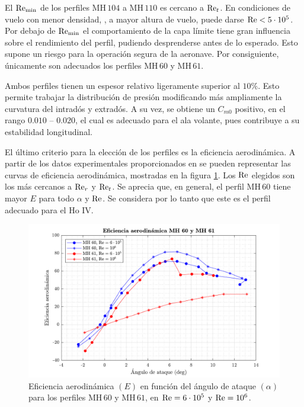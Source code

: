 \noindent
El $\mathrm{Re}_\text{min}$ de los perfiles $\mathrm{MH}\,104$ a $\mathrm{MH}\,110$ es cercano a $\mathrm{Re}_t$. En condiciones de vuelo con menor densidad, \eg, a mayor altura de vuelo, puede darse $\mathrm{Re} < 5 \cdot 10^5$. Por debajo de $\mathrm{Re}_\text{min}$ el comportamiento de la capa límite tiene gran influencia sobre el rendimiento del perfil, pudiendo desprenderse antes de lo esperado. Esto supone un riesgo para la operación segura de la aeronave. Por consiguiente, únicamente son adecuados los perfiles $\mathrm{MH}\,60$ y $\mathrm{MH}\,61$.

Ambos perfiles tienen un espesor relativo ligeramente superior al $10\%$. Esto permite trabajar la distribución de presión modificando más ampliamente la curvatura del intradós y extradós. A su vez, se obtiene un $C_{m0}$ positivo, en el rango $0.010$ -- $0.020$, el cual es adecuado para el ala volante, pues contribuye a su estabilidad longitudinal.

El último criterio para la elección de los perfiles es la eficiencia aerodinámica. A partir de los datos experimentales proporcionados en \cite{aerotools_1} se pueden representar las curvas de eficiencia aerodinámica, mostradas en la figura \ref{fig:mh60_mh61_efficiency}. Los $\mathrm{Re}$ elegidos son los más cercanos a $\mathrm{Re}_r$ y $\mathrm{Re}_t$. Se aprecia que, en general, el perfil $\mathrm{MH}\,60$ tiene mayor $E$ para todo $\alpha$ y $\mathrm{Re}$. Se considera por lo tanto que este es el perfil adecuado para el Ho IV.
\begin{figure}[ht]
    \centering
    \includegraphics[width=\linewidth]{imagenes/eleccion_perfil/mh60_mh61_efficiency.pdf}
    \caption{Eficiencia aerodinámica $\left( E \right)$ en función del ángulo de ataque $\left( \alpha \right)$ para los perfiles $\mathrm{MH}\,60$ y $\mathrm{MH}\,61$, en $\mathrm{Re} = 6 \cdot 10^5$ y $\mathrm{Re} = 10^6$.}
    \label{fig:mh60_mh61_efficiency}
    \vspace{-4mm}
\end{figure}

